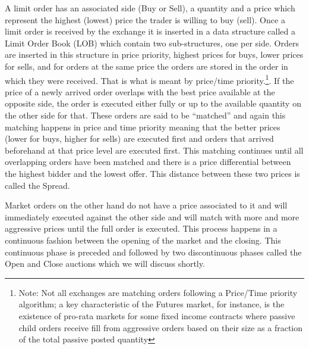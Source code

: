 A limit order has an associated side (Buy or Sell), a quantity and a price which represent the highest (lowest) price the trader is willing to buy (sell). Once a limit order is received by the exchange it is inserted in a data structure called a Limit Order Book (LOB) which contain two sub-structures, one per side. Orders are inserted in this structure in price priority, highest prices for buys, lower prices for sells, and for orders at the same price the orders are stored in the order in which they were received. That is what is meant by price/time priority.\footnote{Note: Not all exchanges are matching orders following a Price/Time priority algorithm; a key characteristic of the Futures market, for instance, is the existence of pro-rata markets for some fixed income contracts where passive child orders receive fill from aggressive orders based on their size as a fraction of the total passive posted quantity}. If the price of a newly arrived order overlaps with the best price available at the opposite side, the order is executed either fully or up to the available quantity on the other side for that. These orders are said to be ``matched'' and again this matching happens in price and time priority meaning that the better prices (lower for buys, higher for sells) are executed first and orders that arrived beforehand at that price level are executed first.  This matching continues until all overlapping orders have been matched and there is a price differential between the highest bidder and the lowest offer. This distance between these two prices is called the Spread.


Market orders on the other hand do not have a price associated to it and will immediately executed against the other side and will match with more and more aggressive prices until the full order is executed. This process happens in a continuous fashion between the opening of the market and the closing. This continuous phase is preceded and followed by two discontinuous phases called the Open and Close auctions which we will discuss shortly. \\







